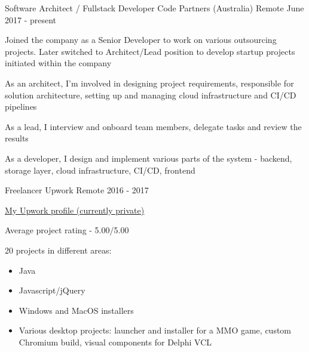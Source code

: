 

\begin{cventries}

  \cventry
  {Software Architect / Fullstack Developer} %
  {Code Partners (Australia)} %
  {Remote} %
  {June 2017 - present} %
  {
    \begin{cvitems} %
      \item Joined the company as a Senior Developer to work on various outsourcing projects. Later switched to Architect/Lead position to develop startup projects initiated within the company
      \item As an architect, I'm involved in designing project requirements, responsible for solution architecture, setting up and managing cloud infrastructure and CI/CD pipelines
      \item As a lead, I interview and onboard team members, delegate tasks and review the results
      \item As a developer, I design and implement various parts of the system - backend, storage layer, cloud infrastructure, CI/CD, frontend
    \end{cvitems}
  }

  \cventry
    {Freelancer} %
    {Upwork} %
    {Remote} %
    {2016 - 2017} %
    {
      \begin{cvitems} %
        \item {\color{awesome-skyblue}\href{https://www.upwork.com/freelancers/~01fe466a51a96a2b6a}{\underline{My Upwork profile (currently private)}}}
        \item {Average project rating - 5.00/5.00}
        \item {
        	20 projects in different areas:
            \begin{itemize}[label={•},leftmargin=10pt]
				\item Java
				\item Javascript/jQuery
				\item Windows and MacOS installers
            	\item Various desktop projects: launcher and installer for a MMO game, custom Chromium build, visual components for Delphi VCL
			\end{itemize}
        }
      \end{cvitems}
    }


\end{cventries}
